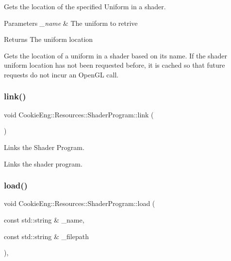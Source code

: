 Gets the location of the specified Uniform in a shader. 


\begin{DoxyParams}{Parameters}
{\em \+\_\+name} & The uniform to retrive \\
\hline
\end{DoxyParams}
\begin{DoxyReturn}{Returns}
The uniform location
\end{DoxyReturn}
Gets the location of a uniform in a shader based on its name. If the shader uniform location has not been requested before, it is cached so that future requests do not incur an Open\+GL call. \mbox{\label{class_cookie_eng_1_1_resources_1_1_shader_program_ac1c103a1f174c4053a94b65e4f32ccfc}} 
\subsubsection{\texorpdfstring{link()}{link()}}
{\footnotesize\ttfamily void Cookie\+Eng\+::\+Resources\+::\+Shader\+Program\+::link (\begin{DoxyParamCaption}{ }\end{DoxyParamCaption})}



Links the Shader Program. 

Links the shader program. \mbox{\label{class_cookie_eng_1_1_resources_1_1_shader_program_aef29916bad667d1f820053fd891d9e58}} 
\subsubsection{\texorpdfstring{load()}{load()}}
{\footnotesize\ttfamily void Cookie\+Eng\+::\+Resources\+::\+Shader\+Program\+::load (\begin{DoxyParamCaption}\item[{const std\+::string \&}]{\+\_\+name,  }\item[{const std\+::string \&}]{\+\_\+filepath }\end{DoxyParamCaption})\hspace{0.3cm}{\ttfamily [override]}, {\ttfamily [virtual]}}



